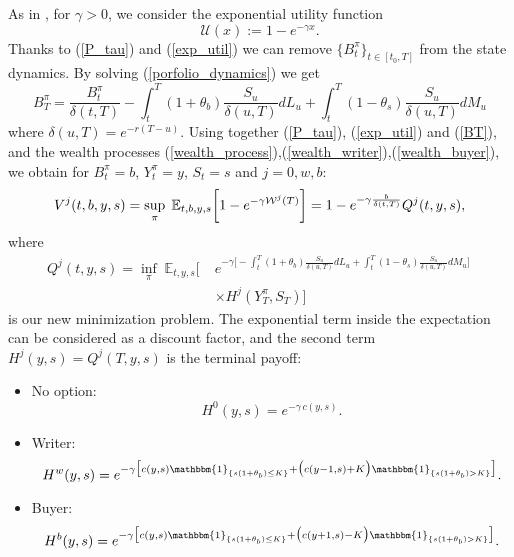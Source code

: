 As in \cite{DaPaZa93}, for $\gamma>0$, we consider the exponential utility function
\begin{equation}\label{exp_util}
 \mathcal{U}(x) := 1- e^{-\gamma x}.
\end{equation}
Thanks to (\ref{P_tau}) and (\ref{exp_util}) we can remove $\{B^{\pi}_t\}_{t \in [t_0,T]}$ from the state dynamics.
By solving (\ref{porfolio_dynamics}) we get
\begin{equation}\label{BT}
B^{\pi}_T =  \frac{B^{\pi}_{t}}{\delta(t,T)} - \int_{t}^T
(1+\theta_b)\frac{S_u}{\delta(u,T)} dL_u + \int_{t}^T
 (1-\theta_s) \frac{S_u}{\delta(u,T)} dM_u 
\end{equation}
where $\delta(u,T) = e^{-r(T-u)}$.
Using together (\ref{P_tau}), (\ref{exp_util}) and (\ref{BT}), and the wealth processes (\ref{wealth_process}),(\ref{wealth_writer}),(\ref{wealth_buyer}), 
we obtain for $B^\pi_{t} = b$, $Y^\pi_{t} = y$, $S_{t} = s$ and $j=0,w,b$:
\begin{align}\label{var_reduct}
   V^j(t,b,y,s) = \sup_{\pi} \; \E_{t,b,y,s}\biggl[  1- e^{-\gamma \mathcal{W}^j(T) } \biggr]  %
	     = 1- e^{-\gamma \frac{b}{\delta(t,T)}} Q^j(t,y,s),
\end{align} 
where
\begin{align}\label{minimization}
Q^j(t,y,s) = \inf_{\pi} \; \mathbb{E}_{t,y,s}\biggl[ \; &
	     e^{-\gamma \bigl[ -\int_{t}^T (1+\theta_b) \frac{S_u}{\delta(u,T)} dL_u +
	     \int_{t}^T (1-\theta_s) \frac{S_u}{\delta(u,T)} dM_u \bigr] } \, \\ \nonumber 
	     & \times H^j(Y^{\pi}_T,S_T) \bigg]  
\end{align}
is our new minimization problem.
The exponential term inside the expectation can be considered as a discount factor, and the second term 
$H^j(y,s) = Q^j(T,y,s)$ is the terminal payoff:
\begin{itemize}
 \item No option:
 \begin{equation}\label{terminal_c}
  H^0(y,s) = e^{-\gamma \, c(y,s)}.
 \end{equation}
 \item Writer:
  \begin{equation}\label{terminal_w}
  H^w(y,s) = e^{-\gamma \bigl[ c(y,s)\mathbbm{1}_{\{s(1+\theta_b) \leq K\}} + 
 \bigl( c( y-1,s) + K \bigr) \mathbbm{1}_{\{s(1+\theta_b)>K\}} \bigr] }.
 \end{equation}
 \item Buyer:
  \begin{equation}\label{terminal_b}
  H^b(y,s) = e^{-\gamma \bigl[ c(y,s)\mathbbm{1}_{\{s(1+\theta_b) \leq K\}} + 
 \bigl( c( y+1,s) - K \bigr) \mathbbm{1}_{\{s(1+\theta_b)>K\}} \bigr] }.
 \end{equation}
\end{itemize}
